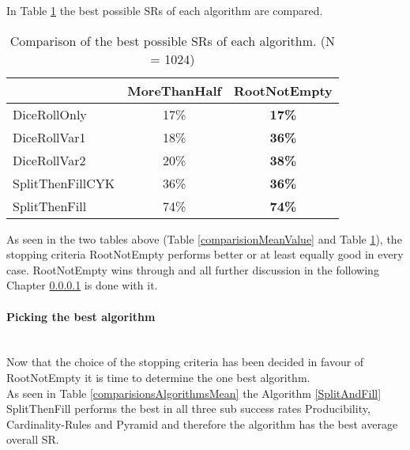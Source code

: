 \noindent In Table \ref{comparisionStoppingCriteria} the best possible SRs of each algorithm are compared.\\



\begin{table}[h]
	\centering
		\begin{tabular}{l|c|c|}
			\cline{2-3}
			& MoreThanHalf & RootNotEmpty \\ \hline
			\multicolumn{1}{|l|}{DiceRollOnly}  & 17\%             & \textbf{17\%}            \\ \hline
			\multicolumn{1}{|l|}{DiceRollVar1}  & 18\%             & \textbf{36\%}            \\ \hline
			\multicolumn{1}{|l|}{DiceRollVar2}  & 20\%             & \textbf{38\%}            \\ \hline
			\multicolumn{1}{|l|}{SplitThenFillCYK} & 36\%             & \textbf{36\%}            \\ \hline
			\multicolumn{1}{|l|}{SplitThenFill}  & 74\%             & \textbf{74\%}             \\ \hline
		\end{tabular}
	\caption{Comparison of the best possible SRs of each algorithm. (N = 1024)}
	\label{comparisionStoppingCriteria}
\end{table}
\noindent As seen in the two tables above (Table \ref{comparisionMeanValue} and Table \ref{comparisionStoppingCriteria}), the stopping criteria RootNotEmpty performs better or at least equally good in every case. RootNotEmpty wins through and all further discussion in the following Chapter \ref{comparisonOfTheAlgorithms} is done with it.
\clearpage
\paragraph{Picking the best algorithm}\label{comparisonOfTheAlgorithms}~\\
Now that the choice of the stopping criteria has been decided in favour of RootNotEmpty it is time to determine the one best algorithm.\\

\noindent As seen in Table \ref{comparisionsAlgorithmsMean} the Algorithm \ref{SplitAndFill} SplitThenFill performs the best in all three sub success rates Producibility, Cardinality-Rules and Pyramid and therefore the algorithm has the best average overall SR.\\


